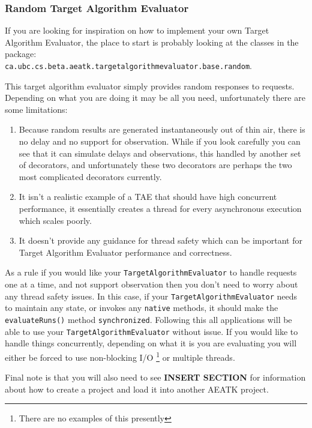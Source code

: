 \documentclass[11pt,letterpaper,oneside]{article}
\begin{document}
\subsubsection{Random Target Algorithm Evaluator}

If you are looking for inspiration on how to implement your own Target Algorithm Evaluator, the place to start is probably looking at the classes in the package: \\
\texttt{ca.ubc.cs.beta.aeatk.targetalgorithmevaluator.base.random}.

This target algorithm evaluator simply provides random responses to requests. Depending on what you are doing it may be all you need, unfortunately there are some limitations:

\begin{enumerate}
\item Because random results are generated instantaneously out of thin air, there is no delay and no support for observation. While if you look carefully you can see that it can simulate delays and observations, this handled by another set of decorators, and unfortunately these two decorators are perhaps the two most complicated decorators currently.
\item It isn't a realistic example of a TAE that should have high concurrent performance, it essentially creates a thread for every asynchronous execution which scales poorly.
\item It doesn't provide any guidance for thread safety which can be important for Target Algorithm Evaluator performance and correctness.
\end{enumerate}

As a rule if you would like your \texttt{TargetAlgorithmEvaluator} to handle requests one at a time, and not support observation then you don't need to worry about any thread safety issues. In this case, if your \texttt{TargetAlgorithmEvaluator} needs to maintain any state, or invokes any \texttt{native} methods, it should make the \texttt{evaluateRuns()} method \texttt{synchronized}. Following this all applications will be able to use your \texttt{TargetAlgorithmEvaluator} without issue. If you would like to handle things concurrently, depending on what it is you are evaluating you will either be forced to use non-blocking I/O \footnote{There are no examples of this presently} or multiple threads.

Final note is that you will also need to see {\Large \textbf{INSERT SECTION}} for information about how to create a project and load it into another AEATK project.
\end{document}
